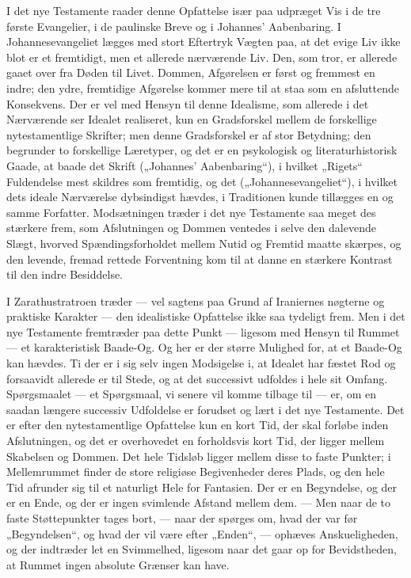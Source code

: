\documentclass[12pt,a4paper,openany]{book}
\newcommand{\opage}[1]{\marginnote{\footnotesize\textit{[#1]}}}
\begin{document}
I det nye Testamente raader denne Opfattelse især paa udpræget Vis i de
tre første Evangelier, i de paulinske Breve og i Johannes’ Aabenbaring.
I Johannesevangeliet lægges med stort Eftertryk Vægten paa, at det evige
Liv ikke blot er et fremtidigt, men et allerede nærværende Liv. Den, som
tror, er allerede gaaet over fra Døden til Livet. Dommen, Afgørelsen er
først og fremmest en indre; den ydre, fremtidige Afgørelse kommer mere
til at staa som en afsluttende Konsekvens. Der er vel med Hensyn til
denne Idealisme, som allerede i det Nærværende ser Idealet realiseret,
\opage{32}kun en Gradsforskel mellem de forskellige nytestamentlige
Skrifter; men denne Gradsforskel er af stor Betydning; den begrunder to
forskellige Læretyper, og det er en psykologisk og literaturhistorisk
Gaade, at baade det Skrift („Johannes’ Aabenbaring“), i hvilket „Rigets“
Fuldendelse mest skildres som fremtidig, og det („Johannesevangeliet“),
i hvilket dets ideale Nærværelse dybsindigst hævdes, i Traditionen kunde
tillægges en og samme Forfatter. Modsætningen træder i det nye
Testamente saa meget des stærkere frem, som Afslutningen og Dommen
ventedes i selve den dalevende Slægt, hvorved Spændingsforholdet mellem
Nutid og Fremtid maatte skærpes, og den levende, fremad rettede
Forventning kom til at danne en stærkere Kontrast til den indre
Besiddelse.

I Zarathustratroen træder --- vel sagtens paa Grund af Iraniernes
nøgterne og praktiske Karakter --- den idealistiske Opfattelse ikke saa
tydeligt frem. Men i det nye Testamente fremtræder paa dette Punkt ---
ligesom med Hensyn til Rummet --- et karakteristisk Baade-Og. Og her er
der større Mulighed for, at et Baade-Og kan hævdes. Ti der er i sig selv
ingen Modsigelse i, at Idealet har fæstet Rod og forsaavidt allerede er
til Stede, og at det successivt udfoldes i hele sit Omfang. Spørgsmaalet
--- et Spørgsmaal, vi senere vil komme tilbage til --- er, om en saadan
længere successiv Udfoldelse er forudset og lært i det nye Testamente.
Det er efter den nytestamentlige Opfattelse kun en kort Tid, der skal
forløbe inden Afslutningen, og det er overhovedet en forholdsvis kort
Tid, der ligger mellem Skabelsen og Dommen. Det hele Tidsløb ligger
mellem disse to faste Punkter; i Mellemrummet finder de store religiøse
Begivenheder deres Plads, og den hele Tid afrunder sig til et naturligt
Hele for Fantasien. Der er en Begyndelse, og der er en Ende, og der er
ingen svimlende Afstand mellem dem. --- Men naar de to faste
Støttepunkter tages bort, --- naar der spørges om, hvad der var før
„Begyndelsen“, og hvad der vil være efter „Enden“, --- ophæves
Anskueligheden, og der indtræder let en Svimmelhed, ligesom naar det
gaar op for Bevidstheden, at Rummet ingen absolute Grænser kan have.
\end{document}
